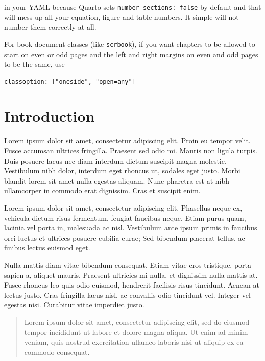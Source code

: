 \documentclass[
  oneside,
  open=any]{scrbook}
\begin{document}
in your YAML because Quarto sets \texttt{number-sections:\ false} by
default and that will mess up all your equation, figure and table
numbers. It simple will not number them correctly at all.

For book document classes (like \texttt{scrbook}), if you want chapters
to be allowed to start on even or odd pages and the left and right
margins on even and odd pages to be the same, use

\begin{verbatim}
classoption: ["oneside", "open=any"]
\end{verbatim}

\hypertarget{introduction}{%
\chapter{Introduction}\label{introduction}}

Lorem ipsum dolor sit amet, consectetur adipiscing elit. Proin eu tempor
velit. Fusce accumsan ultrices fringilla. Praesent sed odio mi. Mauris
non ligula turpis. Duis posuere lacus nec diam interdum dictum suscipit
magna molestie. Vestibulum nibh dolor, interdum eget rhoncus ut, sodales
eget justo. Morbi blandit lorem sit amet nulla egestas aliquam. Nunc
pharetra est at nibh ullamcorper in commodo erat dignissim. Cras et
suscipit enim.

Lorem ipsum dolor sit amet, consectetur adipiscing elit. Phasellus neque
ex, vehicula dictum risus fermentum, feugiat faucibus neque. Etiam purus
quam, lacinia vel porta in, malesuada ac nisl. Vestibulum ante ipsum
primis in faucibus orci luctus et ultrices posuere cubilia curae; Sed
bibendum placerat tellus, ac finibus lectus euismod eget.

Nulla mattis diam vitae bibendum consequat. Etiam vitae eros tristique,
porta sapien a, aliquet mauris. Praesent ultricies mi nulla, et
dignissim nulla mattis at. Fusce rhoncus leo quis odio euismod,
hendrerit facilisis risus tincidunt. Aenean at lectus justo. Cras
fringilla lacus nisl, ac convallis odio tincidunt vel. Integer vel
egestas nisi. Curabitur vitae imperdiet justo.

\begin{quote}
Lorem ipsum dolor sit amet, consectetur adipiscing elit, sed do eiusmod
tempor incididunt ut labore et dolore magna aliqua. Ut enim ad minim
veniam, quis nostrud exercitation ullamco laboris nisi ut aliquip ex ea
commodo consequat.\\
\end{quote}
\end{document}
